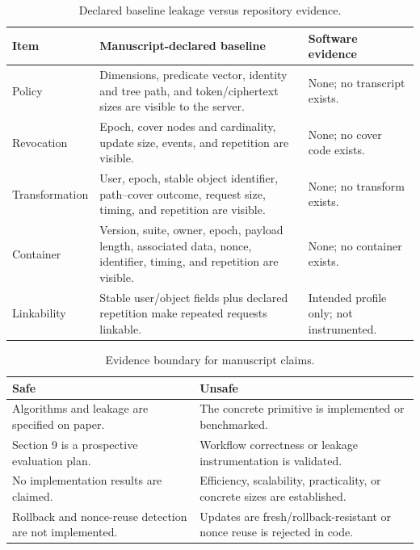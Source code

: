 \begin{table}[t]
\caption{Declared baseline leakage versus repository evidence.}
\label{tab:repo-leakage-audit}
\centering
\small
\begin{tabular}{p{}p{}p{}}
\toprule
Item & Manuscript-declared baseline & Software evidence \\
\midrule
Policy & Dimensions, predicate vector, identity and tree path, and token/ciphertext sizes are visible to the server. & None; no transcript exists. \\
Revocation & Epoch, cover nodes and cardinality, update size, events, and repetition are visible. & None; no cover code exists. \\
Transformation & User, epoch, stable object identifier, path--cover outcome, request size, timing, and repetition are visible. & None; no transform exists. \\
Container & Version, suite, owner, epoch, payload length, associated data, nonce, identifier, timing, and repetition are visible. & None; no container exists. \\
Linkability & Stable user/object fields plus declared repetition make repeated requests linkable. & Intended profile only; not instrumented. \\
\bottomrule
\end{tabular}
\end{table}

\begin{table}[t]
\caption{Evidence boundary for manuscript claims.}
\label{tab:repo-claim-boundary}
\centering
\small
\begin{tabular}{p{}p{}}
\toprule
Safe & Unsafe \\
\midrule
Algorithms and leakage are specified on paper. & The concrete primitive is implemented or benchmarked. \\
Section 9 is a prospective evaluation plan. & Workflow correctness or leakage instrumentation is validated. \\
No implementation results are claimed. & Efficiency, scalability, practicality, or concrete sizes are established. \\
Rollback and nonce-reuse detection are not implemented. & Updates are fresh/rollback-resistant or nonce reuse is rejected in code. \\
\bottomrule
\end{tabular}
\end{table}

